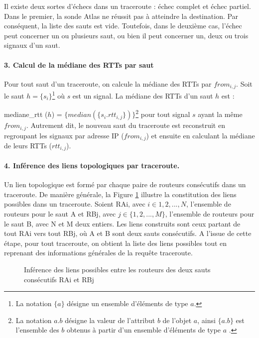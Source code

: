 Il existe deux sortes d'échecs dans un traceroute : échec complet et échec partiel. Dans le premier,   la sonde Atlas ne réussit pas à atteindre la destination. Par conséquent, la liste des sauts est vide. Toutefois, dans le deuxième cas, l'échec peut concerner un ou plusieurs saut, ou bien il peut concerner un, deux ou trois signaux d'un saut.


\paragraph{3. Calcul de la médiane des RTTs par saut} Pour tout saut d'un traceroute,  on calcule la médiane des RTTs par $from_{i,j}$. Soit le saut $h =\{s_i \}$\footnote{La notation $\{ a\}$ désigne un ensemble d'éléments de type $a$.} où $s$ est un  signal. La médiane des RTTs d'un saut $h$ est  :

mediane\_rtt ($h$) =  $\{median(\{s_i.rtt_{i, j}\})\}$\footnote{La notation $a.b$ désigne la valeur de l'attribut $b$ de l'objet $a$, ainsi $\{a.b\}$ est l'ensemble des $b$ obtenus à partir d'un ensemble d'éléments de type $a$ .}  pour tout signal $s$ ayant la même $from_{i,j}$. Autrement dit, le nouveau saut du traceroute est reconstruit en regroupant les signaux par adresse IP ($ from_{i, j} $) et ensuite en calculant la médiane de leurs RTTs ($rtt_{i,j}$). 




\paragraph{4. Inférence des liens topologiques par traceroute.} Un lien topologique est formé par chaque paire de routeurs consécutifs dans un traceroute. De manière générale, la Figure \ref{fig:link-inference} illustre la constitution des liens possibles  dans un traceroute. Soient  RAi, avec $i \in {1,2, ...,N}$,  l'ensemble de routeurs pour le saut A et RBj, avec $j \in \{1,2, ..., M\}$, l'ensemble  de routeurs pour le saut B, avec N et M deux entiers. Les liens  construits sont ceux partant de tout RAi vers tout RBj, où A et B sont deux sauts consécutifs. A l'issue de cette étape, pour tout traceroute, on obtient la liste des liens possibles tout en reprenant des informations générales de la requête traceroute.
\begin{figure}[H]
	\centering
	\captionsetup{justification=centering}
	
	\caption{Inférence des liens possibles entre les routeurs des deux sauts consécutifs RAi et RBj}
	\label{fig:link-inference}
\end{figure}
